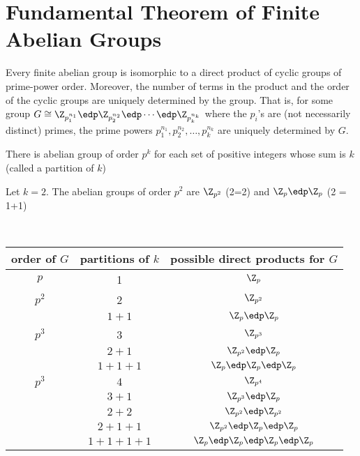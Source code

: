 \section{Fundamental Theorem of Finite Abelian Groups}

\begin{theorem}
    Every finite abelian group is isomorphic to a direct product of cyclic groups of prime-power order. Moreover, the number of terms in the product and the order of the cyclic groups are uniquely determined by the group. That is, for some group \(G\cong \Z_{p_1^{n_1}}\edp \Z_{p_2^{n_2}}\edp\cdots\edp \Z_{p_k^{n_k}}\) where the \(p_i\)'s are (not necessarily distinct) primes, the prime powers \(p_1^{n_1},p_2^{n_2},\ldots,p_k^{n_k}\) are uniquely determined by \(G\).
\end{theorem}


\begin{theorem}
    There is  abelian group of order \(p^k\) for each set of positive integers whose sum is \(k\) (called a partition of \(k\))
\end{theorem}

\begin{example}
    Let \(k=2\). The abelian groups of order \(p^2\) are \(\Z_{p^2}\) (2=2) and \(\Z_p\edp\Z_p\) (2 = 1+1)
\end{example}

\begin{example} \
\begin{center}
    \begin{tabular}{|c|c|c|}
        \hline
        order of \(G\)  & partitions of \(k\)   & possible direct products for \(G\) \\ \hline
        \(p\)           & 1                     & \(\Z_{p}\)              \\ \hline
        \(p^2\)         & 2                     & \(\Z_{p^2}\)            \\
                        & $1 + 1$               & \(\Z_{p}\edp\Z_{p}\)  \\ \hline
        \(p^3\)         & 3                     & \(\Z_{p^3}\) \\
                        & $2 + 1$           &  \(\Z_{p^2}\edp \Z_{p}\) \\
                        & \(1+1+1\)         & \(\Z_{p}\edp \Z_{p}\edp \Z_{p}\) \\ \hline
        \(p^3\)         & \(4\)             & \(\Z_{p^4}\) \\
                        & $3 + 1$           &  \(\Z_{p^3}\edp \Z_{p}\) \\
                        & $2 + 2$           &  \(\Z_{p^2}\edp \Z_{p^2}\) \\
                        & $2 + 1 + 1$       &  \(\Z_{p^2}\edp \Z_{p}\edp \Z_p\) \\
                        & \(1+1+1+1\)         & \(\Z_{p}\edp \Z_{p}\edp \Z_{p}\edp \Z_p\) \\ \hline
    \end{tabular}
\end{center}
\end{example}

